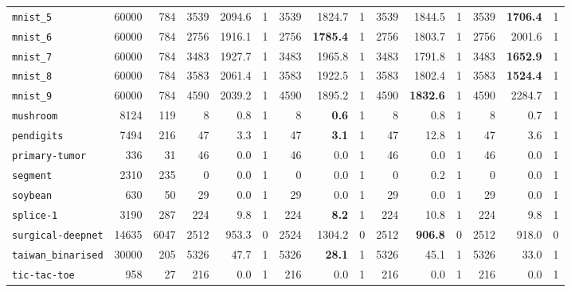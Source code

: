 \begin{tabular}{lccrrrrrrrrrrrr}
\texttt{mnist\_5} & \multicolumn{1}{r}{60000} & \multicolumn{1}{r}{784}  & 3539 & 2094.6 & 1 & 3539 & 1824.7 & 1 & 3539 & 1844.5 & 1 & 3539 & \textbf{1706.4} & 1\\
\texttt{mnist\_6} & \multicolumn{1}{r}{60000} & \multicolumn{1}{r}{784}  & 2756 & 1916.1 & 1 & 2756 & \textbf{1785.4} & 1 & 2756 & 1803.7 & 1 & 2756 & 2001.6 & 1\\
\texttt{mnist\_7} & \multicolumn{1}{r}{60000} & \multicolumn{1}{r}{784}  & 3483 & 1927.7 & 1 & 3483 & 1965.8 & 1 & 3483 & 1791.8 & 1 & 3483 & \textbf{1652.9} & 1\\
\texttt{mnist\_8} & \multicolumn{1}{r}{60000} & \multicolumn{1}{r}{784}  & 3583 & 2061.4 & 1 & 3583 & 1922.5 & 1 & 3583 & 1802.4 & 1 & 3583 & \textbf{1524.4} & 1\\
\texttt{mnist\_9} & \multicolumn{1}{r}{60000} & \multicolumn{1}{r}{784}  & 4590 & 2039.2 & 1 & 4590 & 1895.2 & 1 & 4590 & \textbf{1832.6} & 1 & 4590 & 2284.7 & 1\\
\texttt{mushroom} & \multicolumn{1}{r}{8124} & \multicolumn{1}{r}{119}  & 8 & 0.8 & 1 & 8 & \textbf{0.6} & 1 & 8 & 0.8 & 1 & 8 & 0.7 & 1\\
\texttt{pendigits} & \multicolumn{1}{r}{7494} & \multicolumn{1}{r}{216}  & 47 & 3.3 & 1 & 47 & \textbf{3.1} & 1 & 47 & 12.8 & 1 & 47 & 3.6 & 1\\
\texttt{primary-tumor} & \multicolumn{1}{r}{336} & \multicolumn{1}{r}{31}  & 46 & 0.0 & 1 & 46 & 0.0 & 1 & 46 & 0.0 & 1 & 46 & 0.0 & 1\\
\texttt{segment} & \multicolumn{1}{r}{2310} & \multicolumn{1}{r}{235}  & 0 & 0.0 & 1 & 0 & 0.0 & 1 & 0 & 0.2 & 1 & 0 & 0.0 & 1\\
\texttt{soybean} & \multicolumn{1}{r}{630} & \multicolumn{1}{r}{50}  & 29 & 0.0 & 1 & 29 & 0.0 & 1 & 29 & 0.0 & 1 & 29 & 0.0 & 1\\
\texttt{splice-1} & \multicolumn{1}{r}{3190} & \multicolumn{1}{r}{287}  & 224 & 9.8 & 1 & 224 & \textbf{8.2} & 1 & 224 & 10.8 & 1 & 224 & 9.8 & 1\\
\texttt{surgical-deepnet} & \multicolumn{1}{r}{14635} & \multicolumn{1}{r}{6047}  & 2512 & 953.3 & 0 & 2524 & 1304.2 & 0 & 2512 & \textbf{906.8} & 0 & 2512 & 918.0 & 0\\
\texttt{taiwan\_binarised} & \multicolumn{1}{r}{30000} & \multicolumn{1}{r}{205}  & 5326 & 47.7 & 1 & 5326 & \textbf{28.1} & 1 & 5326 & 45.1 & 1 & 5326 & 33.0 & 1\\
\texttt{tic-tac-toe} & \multicolumn{1}{r}{958} & \multicolumn{1}{r}{27}  & 216 & 0.0 & 1 & 216 & 0.0 & 1 & 216 & 0.0 & 1 & 216 & 0.0 & 1\\

\end{tabular}

